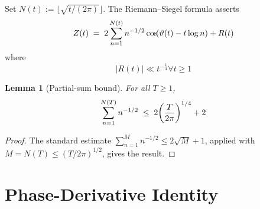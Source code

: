 \documentclass{amsart}
\newcommand{\assign}{:=}
\newtheorem{lemma}{Lemma}
\newcommand{\abs}[1]{\left| #1 \right|}
\begin{document}
Set $N (t) \assign \lfloor \sqrt{t / (2 \pi)} \rfloor$. The Riemann--Siegel
formula {\cite{Siegel1932,Titchmarsh1986}} asserts
\begin{equation}
  \label{eq:RS} Z (t) \hspace{0.27em} = \hspace{0.27em} 2 \sum_{n = 1}^{N (t)}
  n^{- 1 / 2} \cos \hspace{-0.17em} (\vartheta (t) - t \log n) + R (t)
\end{equation}
where
\begin{equation}
  \abs{R (t)} \ll t^{- \frac{1}{4}} \forall t \ge 1
\end{equation}
\begin{lemma}
  [Partial-sum bound]\label{lem:partial} For all $T \ge 1$,
  \begin{equation}
    \sum_{n = 1}^{N (T)} n^{- 1 / 2} \hspace{0.27em} \le \hspace{0.27em} 2
    \hspace{-0.17em} \left( \frac{T}{2 \pi} \right)^{1 / 4} + 2
  \end{equation}
\end{lemma}

\begin{proof}
  The standard estimate $\sum_{n = 1}^M n^{- 1 / 2} \le 2 \sqrt{M} + 1$,
  applied with $M = N (T) \le (T / 2 \pi)^{1 / 2}$, gives the result.
\end{proof}

\section{Phase-Derivative Identity}
\end{document}
